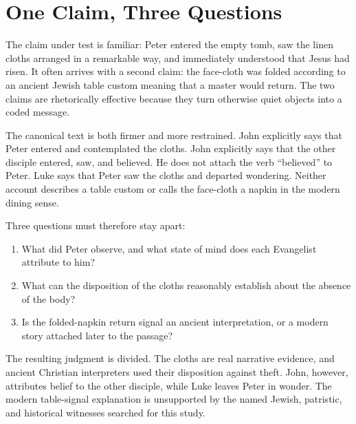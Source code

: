 
\section{One Claim, Three Questions}

The claim under test is familiar: Peter entered the empty tomb, saw the linen
cloths arranged in a remarkable way, and immediately understood that Jesus had
risen. It often arrives with a second claim: the face-cloth was folded according
to an ancient Jewish table custom meaning that a master would return. The two
claims are rhetorically effective because they turn otherwise quiet objects
into a coded message.

The canonical text is both firmer and more restrained. John explicitly says
that Peter entered and contemplated the cloths. John explicitly says that the
other disciple entered, saw, and believed. He does not attach the verb
``believed'' to Peter. Luke says that Peter saw the cloths and departed
wondering. Neither account describes a table custom or calls the face-cloth a
napkin in the modern dining sense.

Three questions must therefore stay apart:

\begin{enumerate}
\item What did Peter observe, and what state of mind does each Evangelist
attribute to him?
\item What can the disposition of the cloths reasonably establish about the
absence of the body?
\item Is the folded-napkin return signal an ancient interpretation, or a modern
story attached later to the passage?
\end{enumerate}

The resulting judgment is divided. The cloths are real narrative evidence, and
ancient Christian interpreters used their disposition against theft. John,
however, attributes belief to the other disciple, while Luke leaves Peter in
wonder. The modern table-signal explanation is unsupported by the named Jewish,
patristic, and historical witnesses searched for this study.

